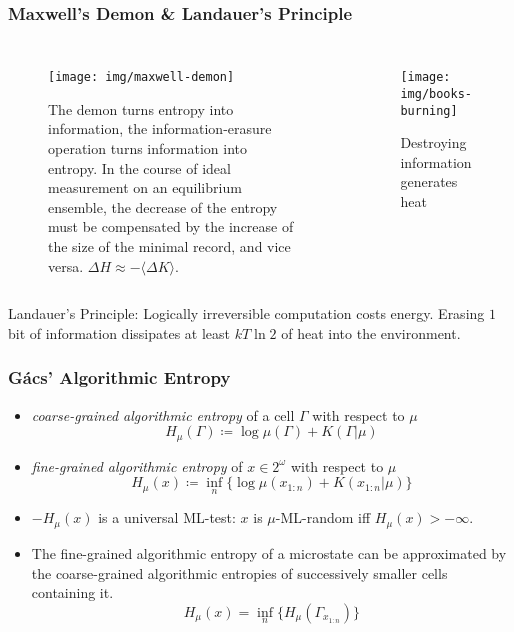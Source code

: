 \documentclass[UTF8,11pt,colorlinks,compress,openany]{beamer}%
\begin{document}
\begin{frame}\frametitle{Maxwell's Demon \& Landauer's Principle}
\begin{columns}
\begin{figure}[H]
\texttt{[image: img/maxwell-demon]}\caption{The demon turns entropy into information, the information-erasure operation turns information into entropy. In the course of ideal measurement on an equilibrium ensemble, the decrease of the entropy must be compensated by the increase of the size of the minimal record, and vice versa. $\Delta H\approx-\langle\Delta K\rangle$.}
\end{figure}
\begin{figure}[H]
\texttt{[image: img/books-burning]}\caption{\tiny Destroying information generates heat}
\end{figure}
\end{columns}
Landauer's Principle: Logically irreversible computation costs energy. Erasing $1$ bit of information dissipates at least $kT\ln2$ of heat into the environment.
\end{frame}

\begin{frame}\frametitle{G\'acs' Algorithmic Entropy}
\setlength\abovedisplayskip{0pt}
\setlength\belowdisplayskip{0pt}
\begin{definition}
\begin{itemize}
	\item \emph{coarse-grained algorithmic entropy} of a cell $\Gamma$ with respect to $\mu$
	\[H_\mu(\Gamma)\coloneqq \log\mu(\Gamma)+K(\Gamma|\mu)\]
	\item \emph{fine-grained algorithmic entropy} of $x\in 2^\omega$ with respect to $\mu$
	\[H_\mu(x)\coloneqq \inf_n\big\{\log\mu(x_{1:n})+K(x_{1:n}|
	\mu)\big\}\]
\end{itemize}
\end{definition}
\begin{itemize}
	\item $-H_\mu(x)$ is a universal ML-test: $x$ is $\mu$-ML-random iff $H_\mu(x)>-\infty$.
	\item The fine-grained algorithmic entropy of a microstate can be approximated by the coarse-grained algorithmic entropies of successively smaller cells containing it.
	\[H_\mu(x)=\inf_n\big\{H_\mu(\Gamma_{x_{1:n}})\big\}\]
\end{itemize}
\end{frame}
\end{document}
